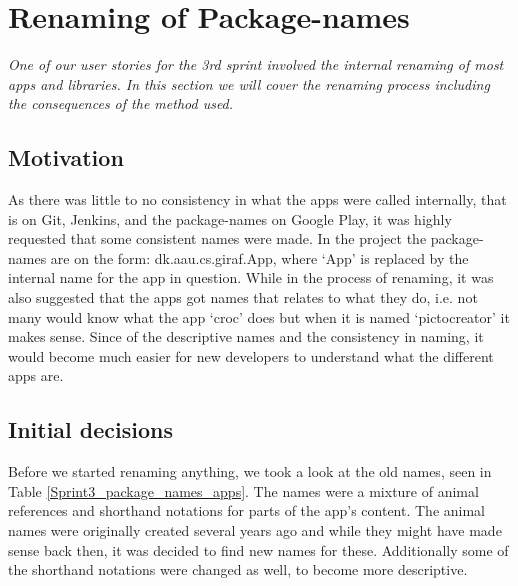 \section{Renaming of Package-names} \label{Sprint3_name}
\textit{One of our user stories for the 3rd sprint involved the internal renaming of most apps and libraries. In this section we will cover the renaming process including the consequences of the method used.}

\subsection{Motivation}
As there was little to no consistency in what the apps were called internally, that is on Git, Jenkins, and the package-names on Google Play, it was highly requested that some consistent names were made. In the project the package-names are on the form: dk.aau.cs.giraf.App, where ‘App’ is replaced by the internal name for the app in question.
While in the process of renaming, it was also suggested that the apps got names that relates to what they do, i.e. not many would know what the app ‘croc’ does but when it is named ‘pictocreator’ it makes sense. Since of the descriptive names and the consistency in naming, it would become much easier for new developers to understand what the different apps are.

\subsection{Initial decisions}
Before we started renaming anything, we took a look at the old names, seen in Table \ref{Sprint3_package_names_apps}. The names were a mixture of animal references and shorthand notations for parts of the app’s content. The animal names were originally created several years ago and while they might have made sense back then, it was decided to find new names for these. Additionally some of the shorthand notations were changed as well, to become more descriptive.

